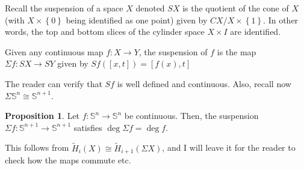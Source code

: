 \documentclass[12pt,reqno]{amsart}
\numberwithin{theorem}{section}
\theoremstyle{definition}
\theoremstyle{remark}
\numberwithin{equation}{section}
\renewcommand{\S}{\mathbb S}
\newcommand{\set}[1]{\left \{ #1 \right \}}
\theoremstyle{definition}
\newtheorem{prop}[theorem]{Proposition}
\begin{document}
Recall the suspension of a space $X$ denoted $SX$ is the quotient of the cone of $X$ (with $X\times \set 0$ being identified as one point) given by $CX/X\times \set 1$. In other words, the top and bottom slices of the cylinder space $X \times I$ are identified.
\begin{definition}
    Given any continuous map $f:X\rightarrow Y$, the suspension of $f$ is the map $\Sigma f:SX\rightarrow SY$ given by $Sf([x,t])=[f(x),t]$
\end{definition}
The reader can verify that $Sf$ is well defined and continuous. Also, recall now $\Sigma \S^n \cong \S^{n+1}$. 
\begin{prop}
    Let $f:\S^n\rightarrow \S^n$ be continuous. Then, the suspension $\Sigma f:\S^{n+1}\rightarrow \S^{n+1}$ satisfies $\deg \Sigma f = \deg f$.
\end{prop}
This follows from $\tilde H_i (X) \cong \tilde H_{i+1}(\Sigma X)$, and I will leave it for the reader to check how the maps commute etc.
\end{document}
